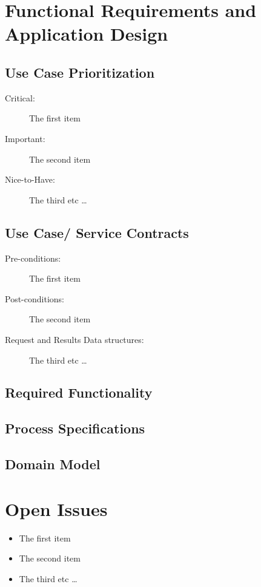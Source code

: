 \documentclass{article}
\begin{document}
	\cleardoublepage
	\section{Functional Requirements and Application Design}\label{sec:functional}
		\subsection{Use Case Prioritization}
			\begin{description}
			  \item[Critical:] The first item
			  \item[Important:] The second item
			  \item[Nice-to-Have:] The third etc \ldots
			\end{description}
			
		\subsection{Use Case/ Service Contracts}
			\begin{description}
			  \item[Pre-conditions:] The first item
			  \item[Post-conditions:] The second item
			  \item[Request and Results Data structures:] The third etc \ldots
			\end{description}
			
		\subsection{Required Functionality}
	
		\subsection{Process Specifications}
		
		\subsection{Domain Model}
		
	\cleardoublepage
	\section{Open Issues}
		\begin{itemize}
		  \item The first item
		  \item The second item
		  \item The third etc \ldots
		\end{itemize}
		
\end{document}
